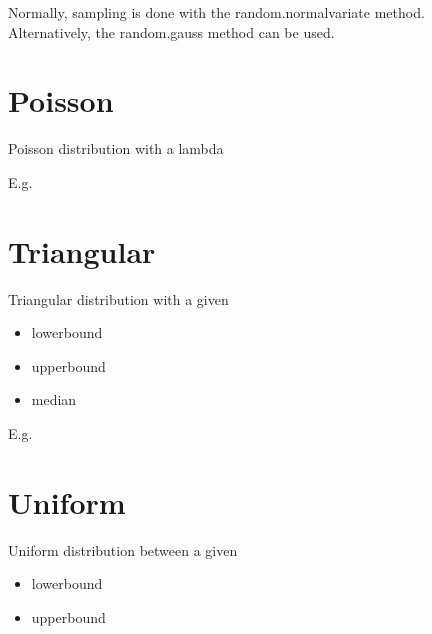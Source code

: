 \documentclass[letterpaper,10pt,english]{sphinxmanual}
\begin{document}
\begin{sphinxVerbatim}[commandchars=\\\{\}]
 
\end{sphinxVerbatim}

Normally, sampling is done with the random.normalvariate method. Alternatively, the random.gauss method can be used.


\section{Poisson}
\label{\detokenize{Distributions:poisson}}
Poisson distribution with a lambda

E.g.

\begin{sphinxVerbatim}[commandchars=\\\{\}]
    
\end{sphinxVerbatim}


\section{Triangular}
\label{\detokenize{Distributions:triangular}}
Triangular distribution with a given
\begin{itemize}
\item {} 
lowerbound

\item {} 
upperbound

\item {} 
median

\end{itemize}

E.g.

\begin{sphinxVerbatim}[commandchars=\\\{\}]
    
\end{sphinxVerbatim}


\section{Uniform}
\label{\detokenize{Distributions:uniform}}
Uniform distribution between a given
\begin{itemize}
\item {} 
lowerbound

\item {} 
upperbound

\end{itemize}
\end{document}

